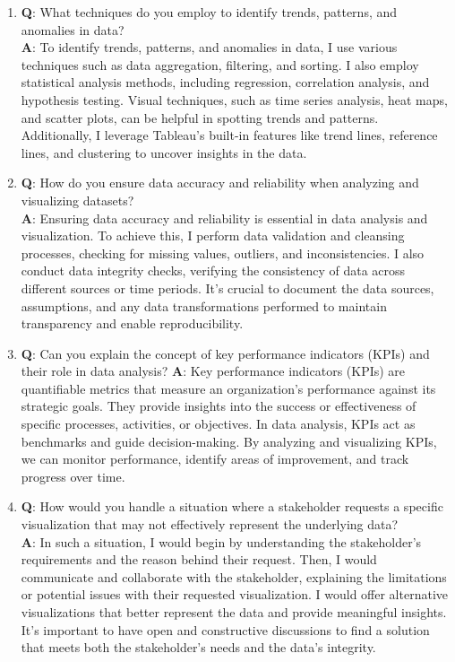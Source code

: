 \begin{enumerate}
	\item \textbf{Q}: What techniques do you employ to identify trends, patterns, and anomalies in data? \\
	\textbf{A}: To identify trends, patterns, and anomalies in data, I use various techniques such as data aggregation, filtering, and sorting. I also employ statistical analysis methods, including regression, correlation analysis, and hypothesis testing. Visual techniques, such as time series analysis, heat maps, and scatter plots, can be helpful in spotting trends and patterns. Additionally, I leverage Tableau's built-in features like trend lines, reference lines, and clustering to uncover insights in the data.
	
	\item \textbf{Q}: How do you ensure data accuracy and reliability when analyzing and visualizing datasets? \\
	\textbf{A}: Ensuring data accuracy and reliability is essential in data analysis and visualization. To achieve this, I perform data validation and cleansing processes, checking for missing values, outliers, and inconsistencies. I also conduct data integrity checks, verifying the consistency of data across different sources or time periods. It's crucial to document the data sources, assumptions, and any data transformations performed to maintain transparency and enable reproducibility.
	
	\item \textbf{Q}: Can you explain the concept of key performance indicators (KPIs) and their role in data analysis?
	\textbf{A}: Key performance indicators (KPIs) are quantifiable metrics that measure an organization's performance against its strategic goals. They provide insights into the success or effectiveness of specific processes, activities, or objectives. In data analysis, KPIs act as benchmarks and guide decision-making. By analyzing and visualizing KPIs, we can monitor performance, identify areas of improvement, and track progress over time.
	
	\item \textbf{Q}: How would you handle a situation where a stakeholder requests a specific visualization that may not effectively represent the underlying data? \\
	\textbf{A}: In such a situation, I would begin by understanding the stakeholder's requirements and the reason behind their request. Then, I would communicate and collaborate with the stakeholder, explaining the limitations or potential issues with their requested visualization. I would offer alternative visualizations that better represent the data and provide meaningful insights. It's important to have open and constructive discussions to find a solution that meets both the stakeholder's needs and the data's integrity.
	

\end{enumerate}
